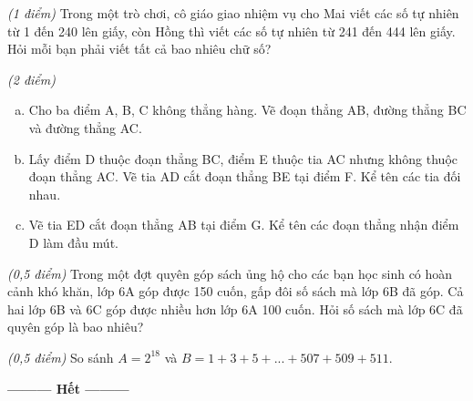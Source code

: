 \begin{ex}
\begin{enumerate}[a)]
\end{enumerate}
\end{ex}     \begin{ex} \textit{(1 điểm)} Trong một trò chơi, cô giáo giao nhiệm vụ cho Mai viết các số tự nhiên từ 1 đến 240 lên giấy, còn Hồng thì viết các số tự nhiên từ 241 đến 444 lên giấy. Hỏi mỗi bạn phải viết tất cả bao nhiêu chữ số?  \\
\end{ex}     \begin{ex} \textit{(2 điểm)} 
 \begin{enumerate}[a)]
\item Cho ba điểm A, B, C không thẳng hàng. Vẽ đoạn thẳng AB, đường thẳng BC và đường thẳng AC. 
\item	Lấy điểm D thuộc đoạn thẳng BC, điểm E thuộc tia AC nhưng không thuộc đoạn thẳng AC. Vẽ tia AD cắt đoạn thẳng BE tại điểm F. Kể tên các tia đối nhau. 
\item	Vẽ tia ED cắt đoạn thẳng AB tại điểm G. Kể tên các đoạn thẳng nhận điểm D làm đầu mút.

\end{enumerate}
\end{ex}     \begin{ex}\textit{(0,5 điểm)} Trong một đợt quyên góp sách ủng hộ cho các bạn học sinh có hoàn cảnh khó khăn, lớp 6A góp được 150 cuốn, gấp đôi số sách mà lớp 6B đã góp. Cả hai lớp 6B và 6C góp được nhiều hơn lớp 6A 100 cuốn. Hỏi số sách mà lớp 6C đã quyên góp là bao nhiêu?\\
\end{ex}     \begin{ex}\textit{(0,5 điểm)} So sánh $A = {2^{18}}$ và $B = 1 + 3 + 5 + ... + 507 + 509 + 511$. 
\end{ex}
\begin{center}
\textbf{\textbf{---------} Hết \textbf{---------}}
\end{center}